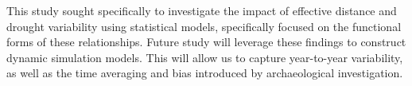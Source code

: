 \documentclass[10pt]{iopart}
\begin{document}







This study sought specifically to investigate the impact of effective distance and drought variability using statistical models, specifically focused on the functional forms of these relationships. Future study will leverage these findings to construct dynamic simulation models. This will allow us to capture year-to-year variability, as well as the time averaging and bias introduced by archaeological investigation.
\end{document}
